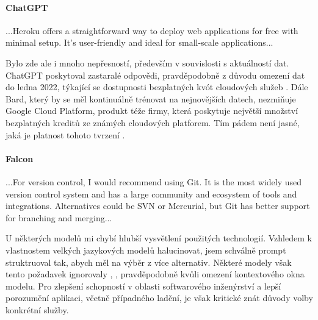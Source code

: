 \documentclass[FM,DP]{tulthesis}
\begin{document}
		\vspace{0.6em}
		\begin{tcolorbox}[colback=white,colframe=black]
			\paragraph{ChatGPT}
			...Heroku offers a straightforward way to deploy web applications for free with minimal setup. It's user-friendly and ideal for small-scale applications... \cite{chatgpt_navrh}
		\end{tcolorbox}
		\vspace{0.6em}
		
		Bylo zde ale i mnoho nepřesností, především v souvislosti s aktuálností dat. ChatGPT poskytoval zastaralé odpovědi, pravděpodobně z důvodu omezení dat do ledna 2022, týkající se dostupnosti bezplatných kvót cloudových služeb \cite{chatgpt_navrh} \cite{chatgpt_knowledge}. Dále Bard, který by se měl kontinuálně trénovat na nejnovějších datech, nezmiňuje Google Cloud Platform, produkt téže firmy, která poskytuje největší množství bezplatných kreditů ze známých cloudových platforem. Tím pádem není jasné, jaká je platnost tohoto tvrzení \cite{bard_navrh} \cite{GCP} \cite{Heroku}.
		
		\vspace{0.6em}
		\begin{tcolorbox}[colback=white,colframe=black]
			\paragraph{Falcon}
			...For version control, I would recommend using Git. It is the most widely used version control system and has a large community and ecosystem of tools and integrations. Alternatives could be SVN or Mercurial, but Git has better support for branching and merging... \cite{falcon_navrh}
		\end{tcolorbox}
		\vspace{0.6em}
		
		U některých modelů mi chybí hlubší vysvětlení použitých technologií. Vzhledem k vlastnostem velkých jazykových modelů halucinovat, jsem schválně prompt struktruoval tak, abych měl na výběr z více alternativ. Některé modely však tento požadavek ignorovaly \cite{gitCopilot_navrh}, \cite{falcon_navrh}, pravděpodobně kvůli omezení kontextového okna modelu. Pro zlepšení schopností v oblasti softwarového inženýrství a lepší porozumění aplikaci, včetně případného ladění, je však kritické znát důvody volby konkrétní služby.
		
\end{document}
